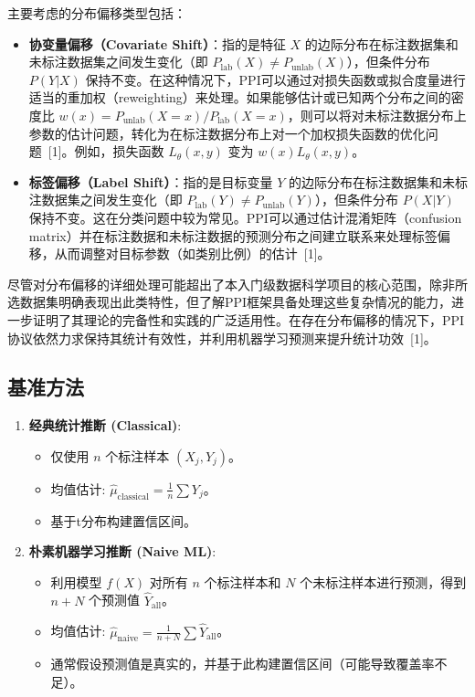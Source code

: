 \documentclass[12pt,a4paper]{article}
\begin{document}
主要考虑的分布偏移类型包括：
\begin{itemize}
    \item \textbf{协变量偏移（Covariate Shift）}：指的是特征 $X$ 的边际分布在标注数据集和未标注数据集之间发生变化（即 $P_{\text{lab}}(X) \neq P_{\text{unlab}}(X)$），但条件分布 $P(Y|X)$ 保持不变。在这种情况下，PPI可以通过对损失函数或拟合度量进行适当的重加权（reweighting）来处理。如果能够估计或已知两个分布之间的密度比 $w(x) = P_{\text{unlab}}(X=x) / P_{\text{lab}}(X=x)$，则可以将对未标注数据分布上参数的估计问题，转化为在标注数据分布上对一个加权损失函数的优化问题~{[1]}。例如，损失函数 $L_{\theta}(x,y)$ 变为 $w(x)L_{\theta}(x,y)$。
    \item \textbf{标签偏移（Label Shift）}：指的是目标变量 $Y$ 的边际分布在标注数据集和未标注数据集之间发生变化（即 $P_{\text{lab}}(Y) \neq P_{\text{unlab}}(Y)$），但条件分布 $P(X|Y)$ 保持不变。这在分类问题中较为常见。PPI可以通过估计混淆矩阵（confusion matrix）并在标注数据和未标注数据的预测分布之间建立联系来处理标签偏移，从而调整对目标参数（如类别比例）的估计~{[1]}。
\end{itemize}
尽管对分布偏移的详细处理可能超出了本入门级数据科学项目的核心范围，除非所选数据集明确表现出此类特性，但了解PPI框架具备处理这些复杂情况的能力，进一步证明了其理论的完备性和实践的广泛适用性。在存在分布偏移的情况下，PPI协议依然力求保持其统计有效性，并利用机器学习预测来提升统计功效~{[1]}。

\subsection{基准方法}
\begin{enumerate}
    \item \textbf{经典统计推断 (Classical)}:
    \begin{itemize}
        \item 仅使用 $n$ 个标注样本 $(X_j, Y_j)$。
        \item 均值估计: $\hat{\mu}_{\text{classical}} = \frac{1}{n} \sum Y_j$。
        \item 基于t分布构建置信区间。
    \end{itemize}
    \item \textbf{朴素机器学习推断 (Naive ML)}:
    \begin{itemize}
        \item 利用模型 $f(X)$ 对所有 $n$ 个标注样本和 $N$ 个未标注样本进行预测，得到 $n+N$ 个预测值 $\hat{Y}_{\text{all}}$。
        \item 均值估计: $\hat{\mu}_{\text{naive}} = \frac{1}{n+N} \sum \hat{Y}_{\text{all}}$。
        \item 通常假设预测值是真实的，并基于此构建置信区间（可能导致覆盖率不足）。
    \end{itemize}
\end{enumerate}
\end{document}
